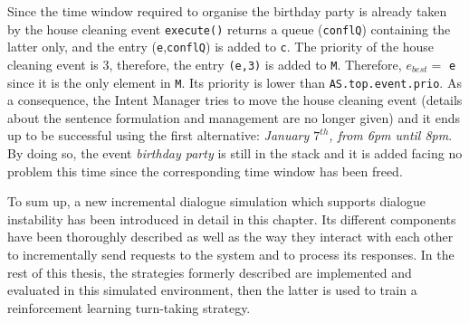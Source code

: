 				Since the time window required to organise the birthday party is already taken by the house cleaning event \texttt{execute()} returns a queue (\texttt{conflQ}) containing the latter only, and the entry (\texttt{e},\texttt{conflQ}) is added to \texttt{c}. The priority of the house cleaning event is 3, therefore, the entry \texttt{(e,3)} is added to \texttt{M}. Therefore, $e_{best} =$ \texttt{e} since it is the only element in \texttt{M}. Its priority is lower than \texttt{AS.top.event.prio}. As a consequence, the Intent Manager tries to move the house cleaning event (details about the sentence formulation and management are no longer given) and it ends up to be successful using the first alternative: \textit{January $7^{th}$, from 6pm until 8pm}. By doing so, the event \textit{birthday party} is still in the stack and it is added facing no problem this time since the corresponding time window has been freed.

                                To sum up, a new incremental dialogue simulation which supports dialogue instability has been introduced in detail in this chapter. Its different components have been thoroughly described as well as the way they interact with each other to incrementally send requests to the system and to process its responses. In the rest of this thesis, the strategies formerly described are implemented and evaluated in this simulated environment, then the latter is used to train a reinforcement learning turn-taking strategy.
